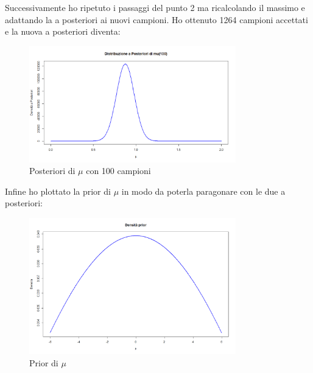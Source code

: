 \documentclass[a4paper,12pt]{article}
\begin{document}
\begin{itemize}
\begin{center}
\begin{tabular}{|c|c|c|c|c|c|}
			\hline
		\end{tabular}
	\end{center}
	Successivamente ho ripetuto i passaggi del punto 2 ma ricalcolando il massimo e adattando la a posteriori ai nuovi campioni.
	Ho ottenuto 1264 campioni accettati e la nuova a posteriori diventa:
	\begin{figure}[h] %
		\centering %
		\includegraphics[width=0.8\textwidth]{newpost.png} %
		\caption{Posteriori di $\mu$ con 100 campioni} %
		\label{fig:immagine} %
	\end{figure}
	\newpage
	Infine ho plottato la prior di $\mu$ in modo da poterla paragonare con le due a posteriori:
	\begin{figure}[h] %
		\centering %
		\includegraphics[width=0.8\textwidth]{prior.png} %
		\caption{Prior di $\mu$} %
		\label{fig:immagine} %
	\end{figure}
	\newpage

\end{itemize}
\end{document}
